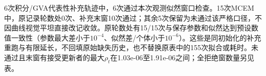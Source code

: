 6次积分/GVA代表性补充轨迹中，6次通过本次观测似然窗口检查。15次MCEM中，原记录轮数处0次、补充末窗10次通过；其余5次保留为未通过该严格口径，不因曲线视觉平坦直接改记收敛。原轮数处有15/15次与保存参数和似然达到预设数值一致性（参数最大差小于$10^{-4}$、似然差/个体小于$10^{-6}$）。这些是同初始化的补充重跑与有限延长，不回填原始缺失历史，也不替换原表中的155次拟合或耗时。未通过且末窗有接受更新者的最大$\rho_t$在1.03e-06至1.91e-06之间；全拒绝窗数量另见表。
